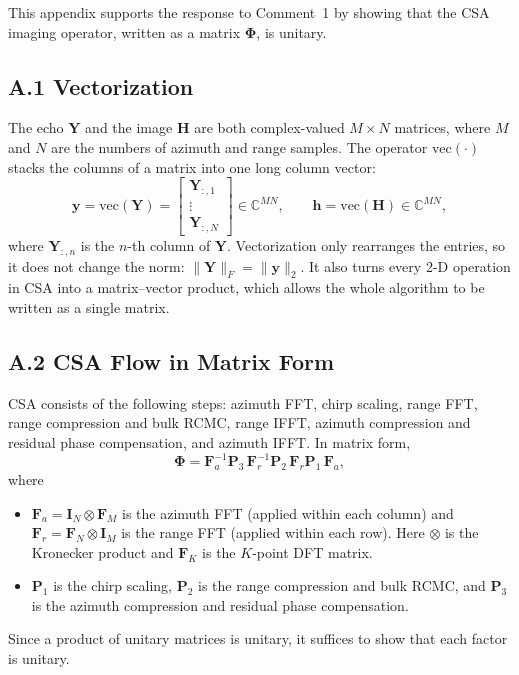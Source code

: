 \documentclass[12pt]{article}
\begin{document}
This appendix supports the response to Comment~1 by showing that the CSA
imaging operator, written as a matrix $\boldsymbol{\Phi}$, is unitary.

\subsection*{A.1 Vectorization}
The echo $\mathbf{Y}$ and the image $\mathbf{H}$ are both complex-valued
$M \times N$ matrices, where $M$ and $N$ are the numbers of azimuth and
range samples. The operator $\mathrm{vec}(\cdot)$ stacks the columns of a
matrix into one long column vector:
\begin{equation*}
  \mathbf{y} = \mathrm{vec}(\mathbf{Y})
    = \begin{bmatrix} \mathbf{Y}_{:,1} \\ \vdots \\ \mathbf{Y}_{:,N} \end{bmatrix}
    \in \mathbb{C}^{MN},
  \qquad
  \mathbf{h} = \mathrm{vec}(\mathbf{H}) \in \mathbb{C}^{MN},
\end{equation*}
where $\mathbf{Y}_{:,n}$ is the $n$-th column of $\mathbf{Y}$. Vectorization
only rearranges the entries, so it does not change the norm:
$\|\mathbf{Y}\|_F = \|\mathbf{y}\|_2$. It also turns every 2-D operation in
CSA into a matrix--vector product, which allows the whole algorithm to be
written as a single matrix.

\subsection*{A.2 CSA Flow in Matrix Form}
CSA consists of the following steps: azimuth FFT, chirp scaling, range FFT,
range compression and bulk RCMC, range IFFT, azimuth compression and residual
phase compensation, and azimuth IFFT. In matrix form,
\begin{equation*}
  \boldsymbol{\Phi} = \mathbf{F}_{a}^{-1}\mathbf{P}_{3}\,
                      \mathbf{F}_{r}^{-1}\mathbf{P}_{2}\,
                      \mathbf{F}_{r}\mathbf{P}_{1}\,\mathbf{F}_{a},
\end{equation*}
where
\begin{itemize}
  \item $\mathbf{F}_{a} = \mathbf{I}_{N} \otimes \mathbf{F}_{M}$ is the
        azimuth FFT (applied within each column) and $\mathbf{F}_{r} =
        \mathbf{F}_{N} \otimes \mathbf{I}_{M}$ is the range FFT (applied
        within each row). Here $\otimes$ is the Kronecker product and
        $\mathbf{F}_{K}$ is the $K$-point DFT matrix.
  \item $\mathbf{P}_{1}$ is the chirp scaling, $\mathbf{P}_{2}$ is the range
        compression and bulk RCMC, and $\mathbf{P}_{3}$ is the azimuth
        compression and residual phase compensation.
\end{itemize}
Since a product of unitary matrices is unitary, it suffices to show that each
factor is unitary.
\end{document}
